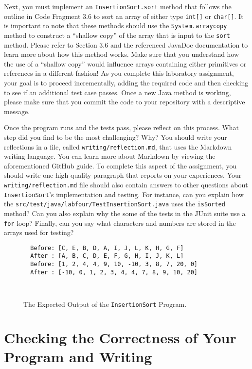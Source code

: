 \documentclass[11pt]{article}
\newcommand{\mainprogram}{\lstinline{InsertionSort}}
\newcommand{\testprogramsource}{\lstinline{src/test/java/labfour/TestInsertionSort.java}}
\newcommand{\reflection}{\lstinline{writing/reflection.md}}
\newcommand{\program}[1]{\lstinline{#1}}
\begin{document}
Next, you must implement an \program{InsertionSort.sort} method that follows the
outline in Code Fragment 3.6 to sort an array of either type \program{int[]} or
\program{char[]}. It is important to note that these methods should use the
\program{System.arraycopy} method to construct a ``shallow copy'' of the array
that is input to the \program{sort} method. Please refer to Section 3.6 and the
referenced JavaDoc documentation to learn more about how this method works.
%
Make sure that you understand how the use of a ``shallow copy'' would influence
arrays containing either primitives or references in a different fashion!
%
As you complete this laboratory assignment, your goal is to proceed
incrementally, adding the required code and then checking to see if an
additional test case passes. Once a new Java method is working, please make sure
that you commit the code to your repository with a descriptive message.

Once the program runs and the tests pass, please reflect on this process. What
step did you find to be the most challenging? Why? You should write your
reflections in a file, called \reflection{}, that uses the Markdown writing
language. You can learn more about Markdown by viewing the aforementioned GitHub
guide. To complete this aspect of the assignment, you should write one
high-quality paragraph that reports on your experiences. Your \reflection{} file
should also contain answers to other questions about \mainprogram{}'s
implementation and testing. For instance, can you explain how the
\testprogramsource{} uses the \program{isSorted} method? Can you also explain
why the some of the tests in the JUnit suite use a \program{for} loop? Finally,
can you say what characters and numbers are stored in the arrays used for
testing?

\begin{figure}[t]
  \centering
  \begin{verbatim}
  Before: [C, E, B, D, A, I, J, L, K, H, G, F]
  After : [A, B, C, D, E, F, G, H, I, J, K, L]
  Before: [1, 2, 4, 4, 9, 10, -10, 3, 8, 7, 20, 0]
  After : [-10, 0, 1, 2, 3, 4, 4, 7, 8, 9, 10, 20]
  \end{verbatim}
  \vspace*{-.35in}
  \caption{The Expected Output of the \mainprogram{} Program.}~\label{fig:output}
  \vspace*{-.25in}
\end{figure}

\section*{Checking the Correctness of Your Program and Writing}
\end{document}
